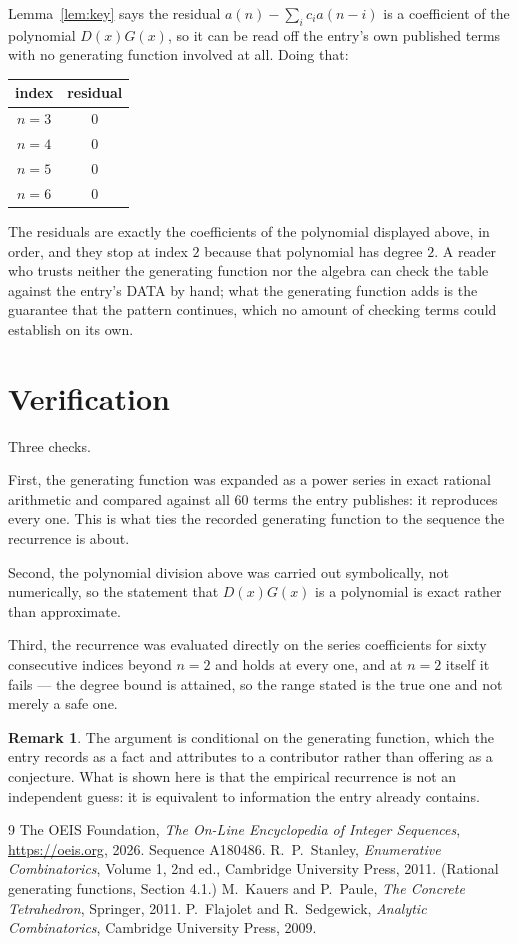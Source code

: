 \documentclass[11pt,a4paper]{article}
\theoremstyle{plain}
\theoremstyle{definition}
\newtheorem{remark}[theorem]{Remark}
\begin{document}
Lemma~\ref{lem:key} says the residual $a(n)-\sum_ic_ia(n-i)$ is a coefficient of the
polynomial $D(x)G(x)$, so it can be read off the entry's own published terms with no
generating function involved at all. Doing that:
\begin{center}
\begin{tabular}{cc}
index & residual \\ \hline
$n=3$ & $0$ \\
$n=4$ & $0$ \\
$n=5$ & $0$ \\
$n=6$ & $0$
\end{tabular}
\end{center}
The residuals are exactly the coefficients of the polynomial displayed above, in order, and
they stop at index $2$ because that polynomial has degree $2$. A reader who trusts
neither the generating function nor the algebra can check the table against the entry's DATA
by hand; what the generating function adds is the guarantee that the pattern continues, which
no amount of checking terms could establish on its own.

\section{Verification}

Three checks.

First, the generating function was expanded as a power series in exact rational arithmetic and
compared against all $60$ terms the entry publishes: it reproduces every one. This is
what ties the recorded generating function to the sequence the recurrence is about.

Second, the polynomial division above was carried out symbolically, not numerically, so the
statement that $D(x)G(x)$ is a polynomial is exact rather than approximate.

Third, the recurrence was evaluated directly on the series coefficients for sixty consecutive
indices beyond $n=2$ and holds at every one, and at $n=2$ itself it fails --- the
degree bound is attained, so the range stated is the true one and not merely a safe one.

\begin{remark}
The argument is conditional on the generating function, which the entry records as a fact and
attributes to a contributor rather than offering as a conjecture. What is shown here is that
the empirical recurrence is not an independent guess: it is equivalent to information the
entry already contains.
\end{remark}

\begin{thebibliography}{9}
 The OEIS Foundation, \emph{The On-Line Encyclopedia of Integer
Sequences}, \url{https://oeis.org}, 2026. Sequence A180486.
 R.~P.~Stanley, \emph{Enumerative Combinatorics}, Volume 1, 2nd ed.,
Cambridge University Press, 2011. (Rational generating functions, Section 4.1.)
 M.~Kauers and P.~Paule, \emph{The Concrete Tetrahedron}, Springer, 2011.
 P.~Flajolet and R.~Sedgewick, \emph{Analytic Combinatorics}, Cambridge
University Press, 2009.
\end{thebibliography}
\end{document}
